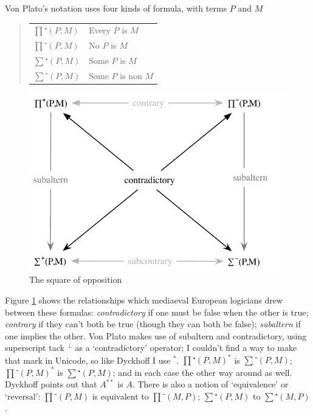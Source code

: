 Von Plato's notation uses four kinds of formula, with terms $P$ and $M$
\begin{quote}
\begin{tabular}{ll}
$∏⁺(P,M)$ & Every $P$ is $M$ \\
$∏⁻(P,M)$ & No $P$ is $M$ \\
$∑⁺(P,M)$ & Some $P$ is $M$ \\
$∑⁻(P,M)$ & Some $P$ is non $M$ \\
\end{tabular}
\end{quote}
\begin{figure}[b]
\centering
\includegraphics[scale=0.5]{pics/Aristotle/square_of_opposition}
\caption{The square of opposition}
\label{fig:Aristotle:square_of_opposition}
\end{figure}
Figure \ref{fig:Aristotle:square_of_opposition} shows the relationships which mediaeval European logicians drew between these formulas: \emph{contradictory} if one must be false when the other is true; \emph{contrary} if they can't both be true (though they can both be false); \emph{subaltern} if one implies the other. Von Plato makes use of subaltern and contradictory, using superscript tack $^{⊥}$ as a `contradictory' operator; I couldn't find a way to make that mark in Unicode, so like Dyckhoff I use $^{*}$. $∏⁺(P,M)^{*}$ is $∑⁻(P,M)$; $∏⁻(P,M)^{*}$ is $∑⁺(P,M)$; and in each case the other way around as well. Dyckhoff points out that $A^{{*}{*}}$ is $A$. There is also a notion of `equivalence' or `reversal': $∏⁻(P,M)$ is equivalent to $∏⁻(M,P)$; $∑⁺(P,M)$ to $∑⁺(M,P)$.

